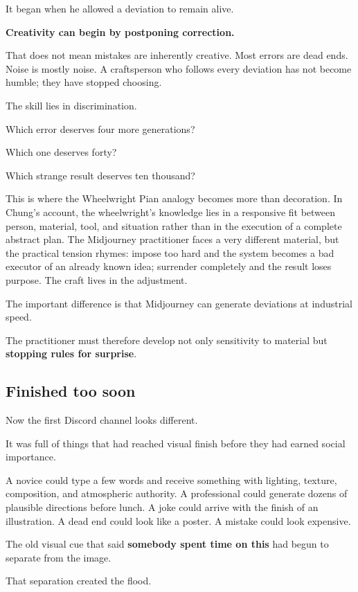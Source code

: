 \documentclass[
]{article}
\begin{document}
It began when he allowed a deviation to remain alive.

\textbf{Creativity can begin by postponing correction.}

That does not mean mistakes are inherently creative. Most errors are
dead ends. Noise is mostly noise. A craftsperson who follows every
deviation has not become humble; they have stopped choosing.

The skill lies in discrimination.

Which error deserves four more generations?

Which one deserves forty?

Which strange result deserves ten thousand?

This is where the Wheelwright Pian analogy becomes more than decoration.
In Chung's account, the wheelwright's knowledge lies in a responsive fit
between person, material, tool, and situation rather than in the
execution of a complete abstract plan. The Midjourney practitioner faces
a very different material, but the practical tension rhymes: impose too
hard and the system becomes a bad executor of an already known idea;
surrender completely and the result loses purpose. The craft lives in
the adjustment.

The important difference is that Midjourney can generate deviations at
industrial speed.

The practitioner must therefore develop not only sensitivity to material
but \textbf{stopping rules for surprise}.

\subsection{Finished too soon}\label{finished-too-soon}

Now the first Discord channel looks different.

It was full of things that had reached visual finish before they had
earned social importance.

A novice could type a few words and receive something with lighting,
texture, composition, and atmospheric authority. A professional could
generate dozens of plausible directions before lunch. A joke could
arrive with the finish of an illustration. A dead end could look like a
poster. A mistake could look expensive.

The old visual cue that said \textbf{somebody spent time on this} had
begun to separate from the image.

That separation created the flood.
\end{document}
